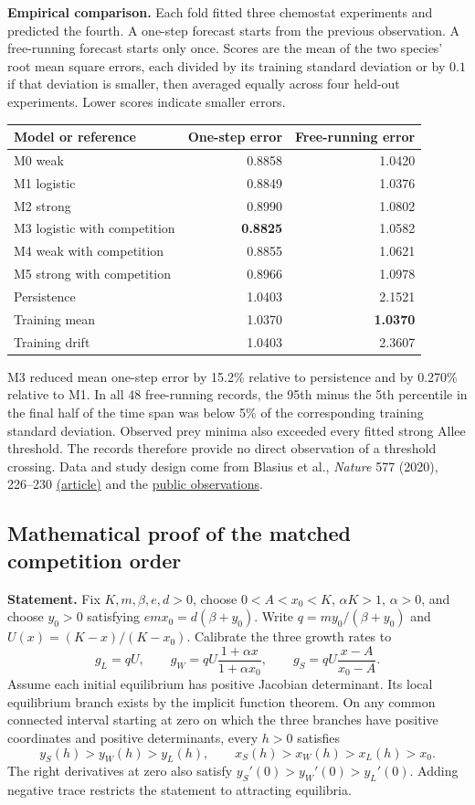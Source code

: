 \textbf{Empirical comparison.} Each fold fitted three chemostat experiments and predicted the fourth. A one-step forecast starts from the previous observation. A free-running forecast starts only once. Scores are the mean of the two species' root mean square errors, each divided by its training standard deviation or by $0.1$ if that deviation is smaller, then averaged equally across four held-out experiments. Lower scores indicate smaller errors.

\begin{center}\small
\begin{tabular}{@{}lrr@{}}\toprule
Model or reference & One-step error & Free-running error\\\midrule
M0 weak & 0.8858 & 1.0420\\
M1 logistic & 0.8849 & 1.0376\\
M2 strong & 0.8990 & 1.0802\\
M3 logistic with competition & \textbf{0.8825} & 1.0582\\
M4 weak with competition & 0.8855 & 1.0621\\
M5 strong with competition & 0.8966 & 1.0978\\
Persistence & 1.0403 & 2.1521\\
Training mean & 1.0370 & \textbf{1.0370}\\
Training drift & 1.0403 & 2.3607\\\bottomrule
\end{tabular}
\end{center}
M3 reduced mean one-step error by 15.2\% relative to persistence and by 0.270\% relative to M1. In all 48 free-running records, the 95th minus the 5th percentile in the final half of the time span was below 5\% of the corresponding training standard deviation. Observed prey minima also exceeded every fitted strong Allee threshold. The records therefore provide no direct observation of a threshold crossing. Data and study design come from Blasius et al., \emph{Nature} 577 (2020), 226--230 \href{https://doi.org/10.1038/s41586-019-1857-0}{(article)} and the \href{https://doi.org/10.6084/m9.figshare.10045976.v1}{public observations}.

\clearpage
\subsection*{Mathematical proof of the matched competition order}
\textbf{Statement.} Fix $K,m,\beta,e,d>0$, choose $0<A<x_0<K$, $\alpha K>1$, $\alpha>0$, and choose $y_0>0$ satisfying $emx_0=d(\beta+y_0)$. Write $q=my_0/(\beta+y_0)$ and $U(x)=(K-x)/(K-x_0)$. Calibrate the three growth rates to
\[
 g_L=qU,\qquad g_W=qU\frac{1+\alpha x}{1+\alpha x_0},\qquad
 g_S=qU\frac{x-A}{x_0-A} .
\]
Assume each initial equilibrium has positive Jacobian determinant. Its local equilibrium branch exists by the implicit function theorem. On any common connected interval starting at zero on which the three branches have positive coordinates and positive determinants, every $h>0$ satisfies
\[
 y_S(h)>y_W(h)>y_L(h),\qquad x_S(h)>x_W(h)>x_L(h)>x_0 .
\]
The right derivatives at zero also satisfy $y_S'(0)>y_W'(0)>y_L'(0)$. Adding negative trace restricts the statement to attracting equilibria.

